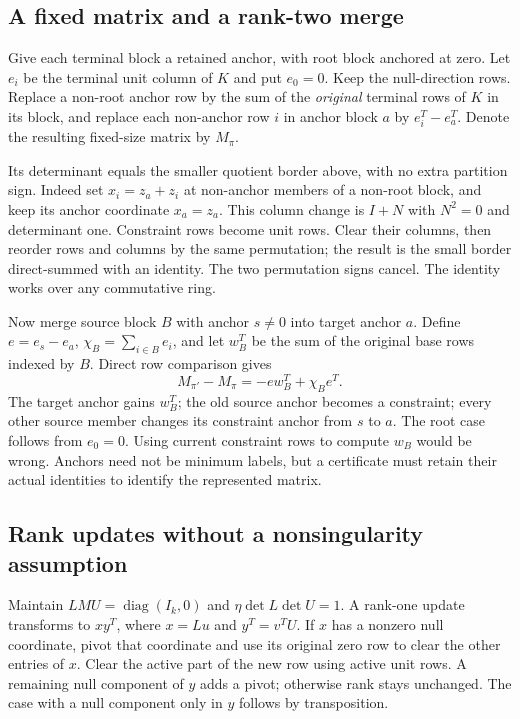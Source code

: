 \subsection{A fixed matrix and a rank-two merge}

Give each terminal block a retained anchor, with root block anchored at
zero. Let $e_i$ be the terminal unit column of $K$ and put $e_0=0$.
Keep the null-direction rows. Replace a non-root anchor row by the sum of
the \emph{original} terminal rows of $K$ in its block, and replace each
non-anchor row $i$ in anchor block $a$ by $e_i^T-e_a^T$. Denote the resulting
fixed-size matrix by $M_\pi$.

Its determinant equals the smaller quotient border above, with no extra
partition sign. Indeed set $x_i=z_a+z_i$ at non-anchor members of a non-root
block, and keep its anchor coordinate $x_a=z_a$. This column change is
$I+N$ with $N^2=0$ and determinant one. Constraint rows become unit rows.
Clear their columns, then reorder rows and columns by the same permutation;
the result is the small border direct-summed with an identity. The two
permutation signs cancel. The identity works over any commutative ring.

Now merge source block $B$ with anchor $s\ne0$ into target anchor $a$.
Define $e=e_s-e_a$, $\chi_B=\sum_{i\in B}e_i$, and let $w_B^T$ be the sum
of the original base rows indexed by $B$. Direct row comparison gives
\[
 M_{\pi'}-M_\pi=-e w_B^T+\chi_B e^T.
\]
The target anchor gains $w_B^T$; the old source anchor becomes a constraint;
every other source member changes its constraint anchor from $s$ to $a$.
The root case follows from $e_0=0$. Using current constraint rows to compute
$w_B$ would be wrong. Anchors need not be minimum labels, but a certificate
must retain their actual identities to identify the represented matrix.

\subsection{Rank updates without a nonsingularity assumption}

Maintain $L M U=\operatorname{diag}(I_k,0)$ and
$\eta\det L\det U=1$. A rank-one update transforms to $xy^T$, where
$x=Lu$ and $y^T=v^TU$. If $x$ has a nonzero null coordinate, pivot that
coordinate and use its original zero row to clear the other entries of
$x$. Clear the active part of the new row using active unit rows. A remaining
null component of $y$ adds a pivot; otherwise rank stays unchanged. The
case with a null component only in $y$ follows by transposition.

